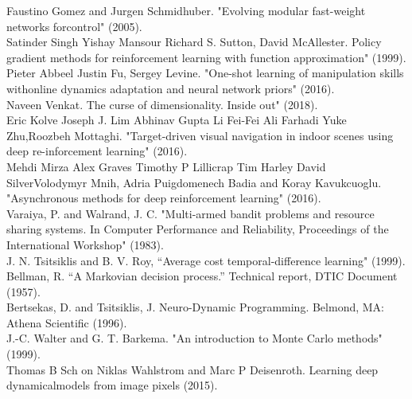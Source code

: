 \begin{thebibliography}{69}
 Faustino Gomez and Jurgen Schmidhuber. "Evolving modular fast-weight networks forcontrol" (2005).\\

 Satinder Singh Yishay Mansour Richard S. Sutton, David McAllester. Policy gradient methods for reinforcement learning with function approximation" (1999).\\

 Pieter Abbeel Justin Fu, Sergey Levine.  "One-shot learning of manipulation skills withonline dynamics adaptation and neural network priors" (2016).\\

 Naveen Venkat. The curse of dimensionality. Inside out" (2018).\\

 Eric Kolve Joseph J. Lim Abhinav Gupta Li Fei-Fei Ali Farhadi Yuke Zhu,Roozbeh Mottaghi. "Target-driven visual navigation in indoor scenes using deep re-inforcement learning" (2016).\\

 Mehdi Mirza Alex Graves Timothy P Lillicrap Tim Harley David SilverVolodymyr Mnih, Adria Puigdomenech Badia and Koray Kavukcuoglu. "Asynchronous methods for deep reinforcement learning" (2016).\\

 Varaiya, P. and Walrand, J. C. "Multi-armed bandit problems and resource sharing systems. In Computer Performance and Reliability, Proceedings of the International Workshop" (1983).\\

 J. N. Tsitsiklis and B. V. Roy, “Average cost temporal-difference learning" (1999).\\

 Bellman, R. “A Markovian decision process.” Technical report, DTIC Document (1957).\\

 Bertsekas, D. and Tsitsiklis, J. Neuro-Dynamic Programming. Belmond, MA: Athena Scientific (1996).\\

 J.-C. Walter and G. T. Barkema. "An introduction to Monte Carlo methods" (1999).\\

 Thomas B Sch on Niklas Wahlstrom and Marc P Deisenroth. Learning deep dynamicalmodels from image pixels (2015).\\


\end{thebibliography}
